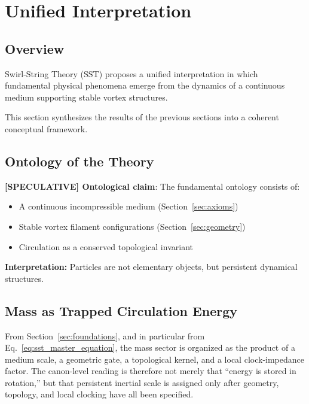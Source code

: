 \documentclass[11pt]{article}
\theoremstyle{definition}
\theoremstyle{plain}
\theoremstyle{remark}
\begin{document}
        
\section{Unified Interpretation}
    \label{sec:unification}
    
    \subsection{Overview}
        
        Swirl-String Theory (SST) proposes a unified interpretation in which fundamental physical phenomena emerge from the dynamics of a continuous medium supporting stable vortex structures.
        
        This section synthesizes the results of the previous sections into a coherent conceptual framework.
    
    \subsection{Ontology of the Theory}
        
        \textbf{[SPECULATIVE] Ontological claim}:
        The fundamental ontology consists of:
        
        \begin{itemize}
            \item A continuous incompressible medium (Section~\ref{sec:axioms})
            \item Stable vortex filament configurations (Section~\ref{sec:geometry})
            \item Circulation as a conserved topological invariant
        \end{itemize}
        
        \textbf{Interpretation:}
        Particles are not elementary objects, but persistent dynamical structures.
    
    \subsection{Mass as Trapped Circulation Energy}
        
        From Section~\ref{sec:foundations}, and in particular from Eq.~\eqref{eq:sst_master_equation}, the mass sector is organized as the product of a medium scale, a geometric gate, a topological kernel, and a local clock-impedance factor. The canon-level reading is therefore not merely that ``energy is stored in rotation,'' but that persistent inertial scale is assigned only after geometry, topology, and local clocking have all been specified.
        
\end{document}
